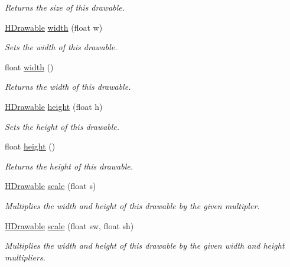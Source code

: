 \begin{DoxyCompactItemize}
\begin{DoxyCompactList}\small\item\em Returns the size of this drawable. \end{DoxyCompactList}\item 
\hyperlink{classhype_1_1drawable_1_1_h_drawable}{H\-Drawable} \hyperlink{classhype_1_1drawable_1_1_h_drawable_a85ed7cc70c40332a18befa8e6e538a71}{width} (float w)
\begin{DoxyCompactList}\small\item\em Sets the width of this drawable. \end{DoxyCompactList}\item 
float \hyperlink{classhype_1_1drawable_1_1_h_drawable_a5ea542d92e402b30ed584e03f417f61f}{width} ()
\begin{DoxyCompactList}\small\item\em Returns the width of this drawable. \end{DoxyCompactList}\item 
\hyperlink{classhype_1_1drawable_1_1_h_drawable}{H\-Drawable} \hyperlink{classhype_1_1drawable_1_1_h_drawable_ac3741d321e7fea3771209e5809aef5b4}{height} (float h)
\begin{DoxyCompactList}\small\item\em Sets the height of this drawable. \end{DoxyCompactList}\item 
float \hyperlink{classhype_1_1drawable_1_1_h_drawable_a20f3702ab5c3ba050174503e5d3fae12}{height} ()
\begin{DoxyCompactList}\small\item\em Returns the height of this drawable. \end{DoxyCompactList}\item 
\hyperlink{classhype_1_1drawable_1_1_h_drawable}{H\-Drawable} \hyperlink{classhype_1_1drawable_1_1_h_drawable_a6166d1dff41c05b3402de387b0172cd1}{scale} (float s)
\begin{DoxyCompactList}\small\item\em Multiplies the width and height of this drawable by the given multipler. \end{DoxyCompactList}\item 
\hyperlink{classhype_1_1drawable_1_1_h_drawable}{H\-Drawable} \hyperlink{classhype_1_1drawable_1_1_h_drawable_aa40926c8864935d6d5b7ea16f3485f9f}{scale} (float sw, float sh)
\begin{DoxyCompactList}\small\item\em Multiplies the width and height of this drawable by the given width and height multipliers. \end{DoxyCompactList}\item 

\end{DoxyCompactItemize}
